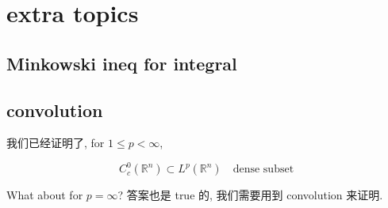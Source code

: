 \chapter{extra topics}\label{extra-topics}

\section{Minkowski ineq for integral}\label{minkowski-ineq-for-integral}

\section{convolution}\label{convolution}

我们已经证明了, for \(1 \leq p < \infty\),

\[C_{c}^{0}(\mathbb{R}^{n}) \subset L^{p}(\mathbb{R}^{n})\quad\text{dense subset}\]

What about for \(p = \infty\)? 答案也是 true 的, 我们需要用到 convolution 来证明.\\
